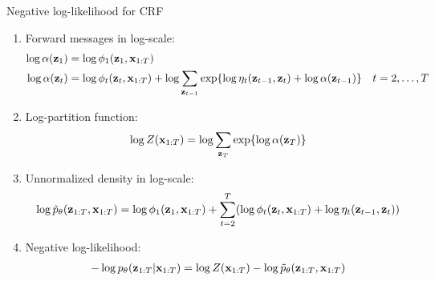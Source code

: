 \documentclass{article}
\begin{document}
\newpage
\begin{algorithm}[H]
\caption{Negative log-likelihood for CRF}
\vspace{1ex}
\begin{enumerate} %
\item 
Forward messages in log-scale:
\begin{align}
\log \alpha (\mathbf{z}_1) 
& = \log \phi_1 (\mathbf{z}_1, \mathbf{x}_{1:T})  \\
\log \alpha (\mathbf{z}_t) 
& = \log \phi_t (\mathbf{z}_t, \mathbf{x}_{1:T}) + \log \sum_{\mathbf{z}_{t-1}} \exp \{ \log \eta_t (\mathbf{z}_{t-1}, \mathbf{z}_t) + \log \alpha (\mathbf{z}_{t-1})  \}   \quad t = 2, \dotsc, T  
\end{align}


\item 
Log-partition function:
\begin{align}
\log Z(\mathbf{x}_{1:T}) = \log \sum_{\mathbf{z}_T} \exp \{ \log \alpha (\mathbf{z}_T)  \}
\end{align}


\item 
Unnormalized density in log-scale: 
\begin{align}
\log \tilde{p}_{\theta} (\mathbf{z}_{1:T}, \mathbf{x}_{1:T})
= \log \phi_1 (\mathbf{z}_1, \mathbf{x}_{1:T}) 
+ \sum_{t=2}^{T}  ( \log \phi_t (\mathbf{z}_t, \mathbf{x}_{1:T}) + \log \eta_t (\mathbf{z}_{t-1}, \mathbf{z}_t) )
\end{align}

\item 
Negative log-likelihood:
\begin{align}
- \log p_{\theta} (\mathbf{z}_{1:T} | \mathbf{x}_{1:T})
= \log Z(\mathbf{x}_{1:T}) - \log \tilde{p}_{\theta} (\mathbf{z}_{1:T}, \mathbf{x}_{1:T})
\end{align}

\end{enumerate}
\end{algorithm}
\end{document}
